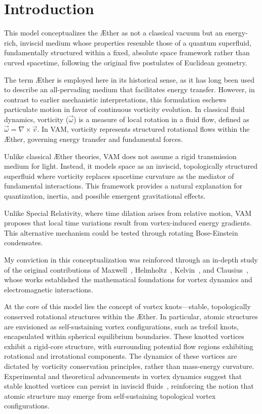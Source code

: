 
\section*{Introduction}
This model conceptualizes the Æther as not a classical vacuum but an energy-rich, inviscid medium whose properties resemble those of a quantum superfluid, fundamentally structured within a fixed, absolute space framework rather than curved spacetime, following the original five postulates of Euclidean geometry.


The term Æther is employed here in its historical sense, as it has long been used to describe an all-pervading medium that facilitates energy transfer.
However, in contrast to earlier mechanistic interpretations, this formulation eschews particulate motion in favor of continuous vorticity evolution. In classical fluid dynamics, vorticity ($\vec{\omega}$) is a measure of local rotation in a fluid flow, defined as $\vec{\omega} = \nabla \times \vec{v}$. In VAM, vorticity represents structured rotational flows within the Æther, governing energy transfer and fundamental forces.

Unlike classical Æther theories, VAM does not assume a rigid transmission medium for light. Instead, it models space as an inviscid, topologically structured superfluid where vorticity replaces spacetime curvature as the mediator of fundamental interactions. This framework provides a natural explanation for quantization, inertia, and possible emergent gravitational effects.

Unlike Special Relativity, where time dilation arises from relative motion, VAM proposes that local time variations result from vortex-induced energy gradients. This alternative mechanism could be tested through rotating Bose-Einstein condensates.



My conviction in this conceptualization was reinforced through an in-depth study of the original contributions of Maxwell~\cite{maxwell1861}, Helmholtz~\cite{helmholtz1858}, Kelvin~\cite{kelvin1867}, and Clausius~\cite{clausius1865}, whose works established the mathematical foundations for vortex dynamics and electromagnetic interactions.

At the core of this model lies the concept of vortex knots—stable, topologically conserved rotational structures within the Æther.
In particular, atomic structures are envisioned as self-sustaining vortex configurations, such as trefoil knots, encapsulated within spherical equilibrium boundaries.
These knotted vortices exhibit a rigid-core structure, with surrounding potential flow regions exhibiting rotational and irrotational components.
The dynamics of these vortices are dictated by vorticity conservation principles, rather than mass-energy curvature.
Experimental and theoretical advancements in vortex dynamics suggest that stable knotted vortices can persist in inviscid fluids~\cite{kleckner2013}, reinforcing the notion that atomic structure may emerge from self-sustaining topological vortex configurations.

